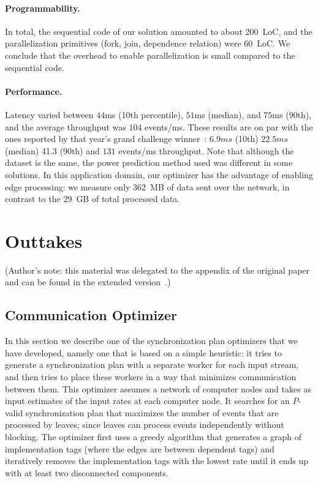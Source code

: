 \paragraph{Programmability.}
In total, the sequential code of our solution amounted to about 200~LoC, and the parallelization primitives (fork, join,
dependence relation) were 60~LoC.  We conclude that the overhead to enable
parallelization is small compared to the sequential code.

\paragraph{Performance.}
Latency varied between $44$ms (10th percentile), $51$ms (median), and
$75$ms (90th), and the average throughput was $104$
events/ms. These results are on par with the ones reported
by that year's grand challenge winner~\cite{mutschler2014predictive}:
$6.9ms$ (10th) $22.5ms$ (median) 41.3 (90th) and $131$ events/ms
throughput.
Note that although the dataset is the same,
the power prediction method used was different in some solutions.  In
this application domain, our optimizer has the advantage of enabling
edge processing: we measure only 362~MB of data sent over the network,
in contrast to the 29~GB of total processed data.

\section{Outtakes}

(Author's note: this material was delegated to the appendix of the original paper and can be found in the extended version~\cite{flumina-arxiv}.)

\subsection{Communication Optimizer}
\label{dgs:appendix:optimizer}

In this section we describe one of the synchronization plan optimizers that we have developed, namely one that is based on a simple
heuristic: it tries to generate a synchronization plan with a
separate worker for each input stream, and then tries to place these
workers in a way that minimizes communication between them.
This optimizer assumes a network of computer nodes and takes as input
estimates of the input rates at each computer node. It searches for an
$P$-valid synchronization plan that maximizes the number of events
that are processed by leaves; since leaves can process events
independently without blocking. The optimizer first uses a greedy
algorithm that generates a graph of implementation tags (where the
edges are between dependent tags) and iteratively removes the implementation
tags with the lowest rate until it ends up with at least two
disconnected components.

